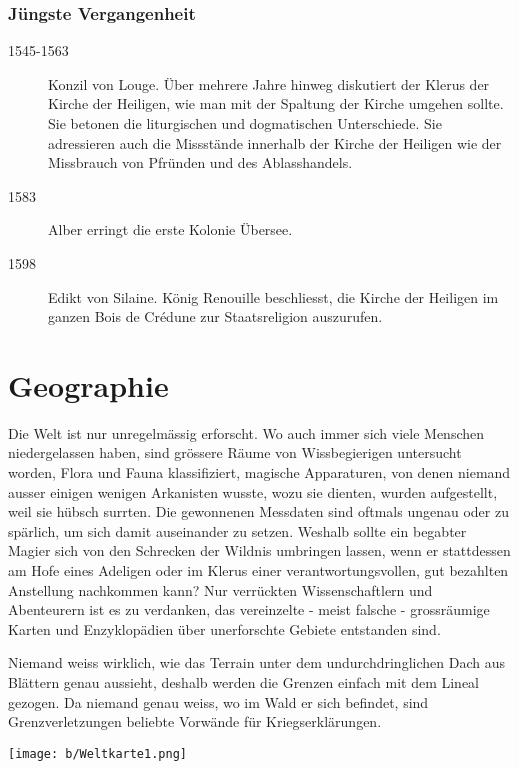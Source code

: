 \documentclass[10pt,twoside,twocolumn,openany]{book}
\begin{document}
	\subsubsection{Jüngste Vergangenheit}
	\begin{description}
		\item[1545-1563] Konzil von Louge. Über mehrere Jahre hinweg diskutiert der Klerus der Kirche der Heiligen, wie man mit der Spaltung der Kirche umgehen sollte. Sie betonen die liturgischen und dogmatischen Unterschiede. Sie adressieren auch die Missstände innerhalb der Kirche der Heiligen wie der Missbrauch von Pfründen und des Ablasshandels.
		\item[1583] Alber erringt die erste Kolonie Übersee.
		\item[1598] Edikt von Silaine. König Renouille beschliesst, die Kirche der Heiligen im ganzen Bois de Crédune zur Staatsreligion auszurufen.
	\end{description}



\section{Geographie}
Die Welt ist nur unregelmässig erforscht. Wo auch immer sich viele Menschen niedergelassen haben, sind grössere Räume von Wissbegierigen untersucht worden, Flora und Fauna klassifiziert, magische Apparaturen, von denen niemand ausser einigen wenigen Arkanisten wusste, wozu sie dienten, wurden aufgestellt, weil sie hübsch surrten. Die gewonnenen Messdaten sind oftmals ungenau oder zu spärlich, um sich damit auseinander zu setzen. Weshalb sollte ein begabter Magier sich von den Schrecken der Wildnis umbringen lassen, wenn er stattdessen am Hofe eines Adeligen oder im Klerus einer verantwortungsvollen, gut bezahlten Anstellung nachkommen kann?
Nur verrückten Wissenschaftlern und Abenteurern ist es zu verdanken, das vereinzelte - meist falsche - grossräumige Karten und Enzyklopädien über unerforschte Gebiete entstanden sind.

Niemand weiss wirklich, wie das Terrain unter dem undurchdringlichen Dach aus Blättern genau aussieht, deshalb werden die Grenzen einfach mit dem Lineal gezogen. Da niemand genau weiss, wo im Wald er sich befindet, sind Grenzverletzungen beliebte Vorwände für Kriegserklärungen.


\begin{figure*}
	\centering
	\texttt{[image: b/Weltkarte1.png]}
\end{figure*}
\end{document}
